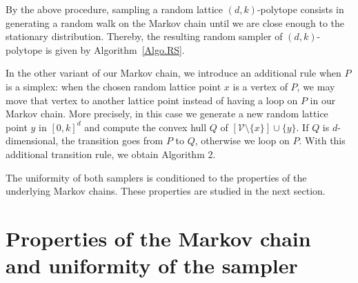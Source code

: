 \documentclass[a4paper]{article}
\newtheorem{remark}{Remark}
\begin{document}
By the above procedure, sampling a random lattice $(d,k)$-polytope consists in generating a random walk on the Markov chain until we are close enough to the stationary distribution. Thereby, the resulting random sampler of $(d, k)$-polytope is given by Algorithm~\ref{Algo.RS}.



%

In the other variant of our Markov chain, we introduce an additional rule when $P$ is a simplex: when the chosen random lattice point $x$ is a vertex of $P$, we may move that vertex to another lattice point instead of having a loop on $P$ in our Markov chain. More precisely, in this case we generate a new random lattice point $y$ in $[0,k]^d$ and compute the convex hull $Q$ of $[\mathcal{V}\mathord{\setminus}\{x\}]\cup\{y\}$. If $Q$ is $d$-dimensional, the transition goes from $P$ to $Q$, otherwise we loop on $P$. With this additional transition rule, we obtain Algorithm 2.




The uniformity of both samplers is conditioned to the properties of the underlying Markov chains. These properties are studied in the next section.

\section{Properties of the Markov chain and uniformity of the sampler}\label{Sec.Pr}
\end{document}
